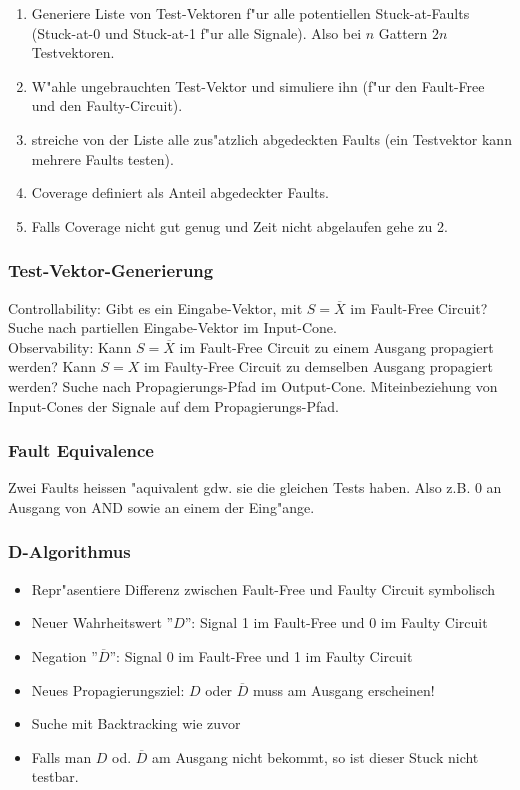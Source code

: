 \documentclass[german, 10pt, a4paper, twocolumn]{scrartcl}
\theoremstyle{definition}
\begin{document}
\begin{enumerate}
	\item Generiere Liste von Test-Vektoren f"ur alle potentiellen Stuck-at-Faults (Stuck-at-0 und Stuck-at-1 f"ur alle Signale). Also bei $n$ Gattern $2n$ Testvektoren.
	\item W"ahle ungebrauchten Test-Vektor und simuliere ihn (f"ur den Fault-Free und den Faulty-Circuit).
	\item streiche von der Liste alle zus"atzlich abgedeckten Faults (ein Testvektor kann mehrere Faults testen).
	\item Coverage definiert als Anteil abgedeckter Faults.
	\item Falls Coverage nicht gut genug und Zeit nicht abgelaufen gehe zu 2.
\end{enumerate}

\subsubsection{Test-Vektor-Generierung}

Controllability: Gibt es ein Eingabe-Vektor, mit $S=\overline{X}$ im Fault-Free Circuit? Suche nach partiellen Eingabe-Vektor im Input-Cone.\\

Observability: Kann $S=\overline{X}$ im Fault-Free Circuit zu einem Ausgang propagiert werden? Kann $S=X$ im Faulty-Free Circuit zu demselben Ausgang propagiert werden? Suche nach Propagierungs-Pfad im Output-Cone. Miteinbeziehung von Input-Cones der Signale auf dem Propagierungs-Pfad.

\subsubsection{Fault Equivalence}

Zwei Faults heissen "aquivalent gdw. sie die gleichen Tests haben. Also z.B. 0 an Ausgang von AND sowie an einem der Eing"ange.

\subsubsection{D-Algorithmus}

\begin{itemize}
	\item Repr"asentiere Differenz zwischen Fault-Free und Faulty Circuit symbolisch
	\item Neuer Wahrheitswert ''$D$'': Signal 1 im Fault-Free und 0 im Faulty Circuit
	\item Negation ''$\overline{D}$'': Signal 0 im Fault-Free und 1 im Faulty Circuit
	\item Neues Propagierungsziel: $D$ oder $\overline{D}$ muss am Ausgang erscheinen!
	\item Suche mit Backtracking wie zuvor
	\item Falls man $D$ od. $\overline{D}$ am Ausgang nicht bekommt, so ist dieser Stuck nicht testbar.
\end{itemize}
\end{document}
